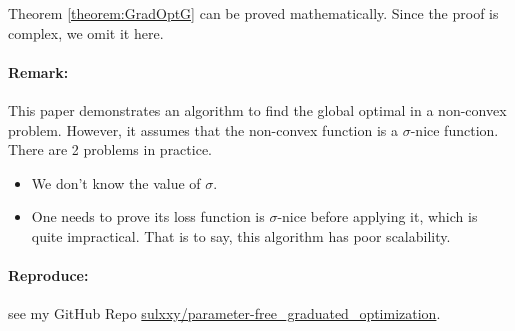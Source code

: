 Theorem \ref{theorem:GradOptG} can be proved mathematically. Since the proof is complex, we omit it here.

\paragraph{Remark: } This paper demonstrates an algorithm to find the global optimal in a non-convex problem. However, it assumes that the non-convex function is a $\sigma$-nice function. There are 2 problems in practice. 
\begin{itemize}
    \item We don't know the value of $\sigma$.
    \item One needs to prove its loss function is $\sigma$-nice before applying it, which is quite impractical. That is to say, this algorithm has poor scalability. 
\end{itemize}

\paragraph{Reproduce: } see my GitHub Repo \href{https://github.com/sulxxy/parameter-free_graduated_optimization/tree/master/reproductions/graduated_opt_for_non-convex}{sulxxy/parameter-free\_graduated\_optimization}.